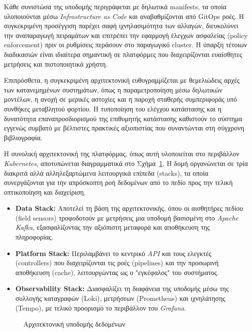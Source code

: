 Κάθε συνιστώσα της υποδομής περιγράφεται με δηλωτικά manifests, τα οποία
υλοποιούνται μέσω \textit{Infrastructure as Code} και αναβαθμίζονται από GitOps
ροές. Η συγκεκριμένη προσέγγιση παρέχει σαφή ιχνηλασιμότητα των αλλαγών,
διευκολύνει την αναπαραγωγή πειραμάτων και επιτρέπει την εφαρμογή έλεγχων
ασφαλείας (policy enforcement) πριν οι ρυθμίσεις περάσουν στο παραγωγικό
cluster. Η ύπαρξη τέτοιων διαδικασιών είναι ιδιαίτερα σημαντική σε πλατφόρμες
που διαχειρίζονται ευαίσθητες μετρήσεις και πιστοποιητικά χρήστη.

Επιπρόσθετα, η συγκεκριμένη αρχιτεκτονική ευθυγραμμίζεται με θεμελιώδεις αρχές
των κατανεμημένων συστημάτων, όπως η παραμετροποίηση μέσω δηλωτικών μοντέλων, η
ανοχή σε μερικές αστοχίες και η παροχή σταθερής συμπεριφοράς υπό συνθήκες
μεταβλητού φορτίου. Η τυποποίηση του ελέγχου κατάστασης και η δυνατότητα
επαναπροσδιορισμού της επιθυμητής κατάστασης καθιστούν το σύστημα εγγενώς
συμβατό με βέλτιστες πρακτικές αξιοπιστίας που συναντώνται στη σύγχρονη
βιβλιογραφία.

Η συνολική αρχιτεκτονική της πλατφόρμας, όπως αυτή υλοποιείται στο περιβάλλον
\textit{Kubernetes}, αποτυπώνεται διαγραμματικά στο Σχήμα~\ref{fig:generic}. Η
δομή οργανώνεται σε τρία διακριτά αλλά αλληλεξαρτώμενα λειτουργικά επίπεδα
(stacks), τα οποία συνεργάζονται για την απρόσκοπτη ροή δεδομένων από το πεδίο
προς την τελική οπτικοποίηση και διαχείριση.

\begin{itemize}
	\item \textbf{Data Stack:} Αποτελεί τη βάση της αρχιτεκτονικής, όπου οι
	      αισθητήρες πεδίου (field sensors) τροφοδοτούν με μετρήσεις μια
	      υποδομή βασισμένη στο \textit{Apache Kafka}, εξασφαλίζοντας την
	      αξιόπιστη μεταφορά και αποθήκευση της πληροφορίας.
	\item \textbf{Platform Stack:} Περιλαμβάνει το κεντρικό \textit{API}
	      και τους ελεγκτές (controllers) που διαχειρίζονται τις ροές
	      (pipelines) και την προσωρινή αποθήκευση (cache), λειτουργώντας
	      ως ο "εγκέφαλος" του συστήματος.
	\item \textbf{Observability Stack:} Διασφαλίζει τη διαφάνεια της
	      υποδομής μέσω της συλλογής καταγραφών (Loki), μετρήσεων
	      (Prometheus) και ιχνηλάτησης (Tempo), με τελικό προορισμό το
	      περιβάλλον του \textit{Grafana}.
\end{itemize}

\begin{figure}[H]
	\centering
	\makebox[\textwidth]{%
	}
	\caption{Αρχιτεκτονική υποδομής δεδομένων}
	\label{fig:generic}
\end{figure}

